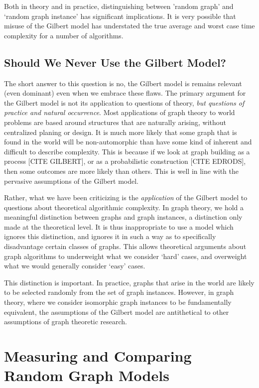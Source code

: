 Both in theory and in practice, distinguishing between 'random graph' and `random graph instance' has significant implications.
It is very possible that misuse of the Gilbert model has understated the true average and worst case time complexity for a number of algorithms.

\subsection{Should We Never Use the Gilbert Model?}

The short answer to this question is no, the Gilbert model is remains relevant (even dominant) even when we embrace these flaws.
The primary argument for the Gilbert model is not its application to questions of theory, \emph{but questions of practice and natural occurrence}.
Most applications of graph theory to world problems are based around structures that are naturally arising, without centralized planing or design.
It is much more likely that some graph that is found in the world will be non-automorphic than have some kind of inherent and difficult to describe complexity.
This is because if we look at graph building as a process [CITE GILBERT], or as a probabilistic construction [CITE EDRODS], then some outcomes are more likely than others.
This is well in line with the pervasive assumptions of the Gilbert model.

Rather, what we have been criticizing is the \emph{application} of the Gilbert model to questions about theoretical algorithmic complexity.
In graph theory, we hold a meaningful distinction between graphs and graph instances, a distinction only made at the theoretical level.
It is thus inappropriate to use a model which ignores this distinction, and ignores it in such a way as to specifically disadvantage certain classes of graphs.
This allows theoretical arguments about graph algorithms to underweight what we consider `hard' cases, and overweight what we would generally consider `easy' cases.

This distinction is important.
In practice, graphs that arise in the world are likely to be selected randomly from the set of graph instances.
However, in graph theory, where we consider isomorphic graph instances to be fundamentally equivalent, the assumptions of the Gilbert model are antithetical to other assumptions of graph theoretic research.

\section{Measuring and Comparing Random Graph Models}

